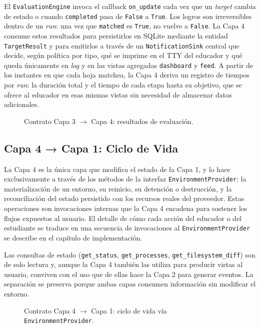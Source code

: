 El \texttt{EvaluationEngine} invoca el callback \texttt{on\_update} cada vez que
un \textit{target} cambia de estado o cuando \texttt{completed} pasa de
\texttt{False} a \texttt{True}. Los logros son irreversibles dentro de un
\textit{run}: una vez que \texttt{matched} es \texttt{True}, no vuelve a
\texttt{False}. La Capa 4
consume estos resultados para persistirlos en SQLite mediante la entidad
\texttt{TargetResult} y para emitirlos a través de un \texttt{NotificationSink}
central que decide, según política por tipo, qué se imprime en el TTY del
educador y qué queda únicamente en \textit{log} y en las vistas agregadas
\texttt{dashboard} y \texttt{feed}. A partir de los instantes en que cada hoja
matchea, la Capa 4 deriva un registro de tiempos por \textit{run}: la duración
total y el
tiempo de cada etapa hasta su objetivo, que se ofrece al educador en esas mismas
vistas sin necesidad de almacenar datos adicionales.
\begin{figure}[h]
    \centering
    \resizebox{\textwidth}{!}{}
    \caption{Contrato Capa 3 $\rightarrow$ Capa 4: resultados de evaluación.}
    \label{fig:contrato-34}
\end{figure}

\subsection{Capa 4 → Capa 1: Ciclo de Vida}

La Capa 4 es la única capa que modifica el estado de la Capa 1, y lo hace
exclusivamente a través de los métodos de la interfaz
\texttt{EnvironmentProvider}: la materialización de un entorno, su reinicio, su
detención o destrucción, y la reconciliación del estado persistido con los
recursos reales del proveedor. Estas operaciones son invocaciones internas que
la Capa 4 encadena para sostener los flujos expuestos al usuario. El detalle de
cómo cada acción del educador o del estudiante se traduce en una secuencia de
invocaciones al \texttt{EnvironmentProvider} se describe en el capítulo de
implementación.

Las consultas de estado (\texttt{get\_status}, \texttt{get\_processes},
\texttt{get\_filesystem\_diff}) son de solo lectura y, aunque la Capa 4 también
las utiliza para producir vistas al usuario, conviven con el uso que de ellas
hace la Capa 2 para generar eventos. La separación se preserva porque ambas
capas consumen información sin modificar el entorno.

\begin{figure}[h]
    \centering
    \resizebox{\textwidth}{!}{}
    \caption{Contrato Capa 4 $\rightarrow$ Capa 1: ciclo de vida vía
    \texttt{EnvironmentProvider}.}
    \label{fig:contrato-41}
\end{figure}

